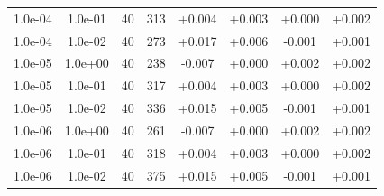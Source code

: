 \documentclass[11pt,a4paper]{article}
\begin{document}
\begin{table}
{\begin{tabular}{*{8}c}
 1.0e-04 	 & 1.0e-01 	 & 40 & 313 	 & +0.004 & +0.003 & +0.000 & +0.002 \\ 
 1.0e-04 	 & 1.0e-02 	 & 40 & 273 	 & +0.017 & +0.006 & -0.001 & +0.001 \\ 
 1.0e-05 	 & 1.0e+00 	 & 40 & 238 	 & -0.007 & +0.000 & +0.002 & +0.002 \\ 
 1.0e-05 	 & 1.0e-01 	 & 40 & 317 	 & +0.004 & +0.003 & +0.000 & +0.002 \\ 
 1.0e-05 	 & 1.0e-02 	 & 40 & 336 	 & +0.015 & +0.005 & -0.001 & +0.001 \\ 
 1.0e-06 	 & 1.0e+00 	 & 40 & 261 	 & -0.007 & +0.000 & +0.002 & +0.002 \\ 
 1.0e-06 	 & 1.0e-01 	 & 40 & 318 	 & +0.004 & +0.003 & +0.000 & +0.002 \\ 
 1.0e-06 	 & 1.0e-02 	 & 40 & 375 	 & +0.015 & +0.005 & -0.001 & +0.001 \\ 
\end{tabular}}
\end{table} 
\end{document}

